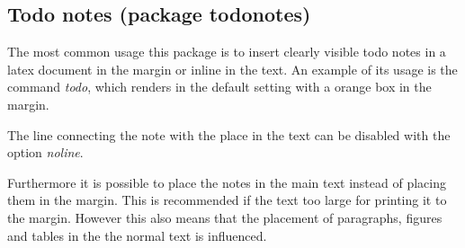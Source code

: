 %

\begin{filecontents*}{\democodefile}
\printglossary[type=symbolslist,style=longtabuFancy, 
               title=longtabuFancy]
\end{filecontents*}

%

\begin{filecontents*}{\democodefile}
\printglossary[type=symbolslist,style=longtabuFancyHeader,
               title=longtabuFancyHeader]
\end{filecontents*}

%


\subsection{Todo notes (package todonotes)}

\begin{filecontents*}{\democodefile}
The most common usage this package is to insert clearly visible todo notes in 
a latex document in the margin or inline 
in the text. An example of its usage is the command \emph{todo}, which 
renders in the default setting with a orange box in the margin.

The line connecting the note with the place in the text can be disabled 
with the option \emph{noline}.

Furthermore it is possible to place the notes in the main text instead 
of placing them in the margin. This is recommended if the text too large for
printing it to the margin. However this also means that the placement of 
paragraphs, figures and tables in the the normal text is influenced.
\end{filecontents*}

